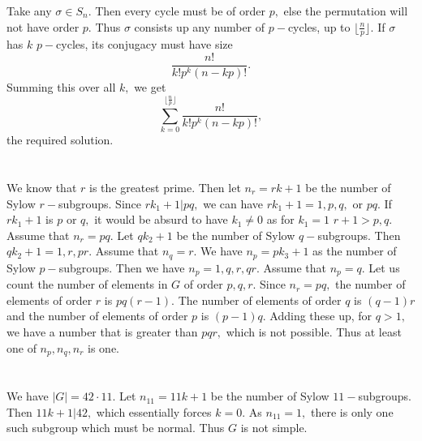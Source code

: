 \documentclass{article}
\begin{document}
Take any $\sigma \in S_n.$ Then every cycle must be of order $p,$ else the permutation will not have order $p.$ Thus $\sigma$ consists up any number of 
$p-$cycles, up to $\lfloor \frac{n}{p} \rfloor.$ If $\sigma$ has $k$ $p-$cycles, its conjugacy must have size $$\frac{n!}{k!p^k(n-kp)!}.$$
Summing this over all $k,$ we get $$\sum_{k=0}^{\lfloor \frac{n}{p} \rfloor} \frac{n!}{k!p^k(n-kp)!} ,$$ the required solution.
\section{} %
We know that $r$ is the greatest prime. Then let $n_r=rk+1$ be the number of Sylow $r-$subgroups. Since $rk_1+1|pq,$ we can have $rk_1+1=1,p,q,$ or $pq.$ If 
$rk_1+1$ is $p$ or $q,$ it would be absurd to have $k_1\neq 0$ as for $k_1=1$ $r+1 > p,q.$ Assume that $n_r=pq.$
Let $ qk_2+1$ be the number of Sylow $q-$subgroups. Then $qk_2+1=1,r,pr.$ Assume that $n_q=r.$ We have $n_p=pk_3+1$ as the number of Sylow $p-$subgroups. 
Then we have $n_p=1, q, r ,qr.$ Assume that $n_p=q.$ Let us count the number of elements in $G$ of order $p,q,r.$ Since $n_r=pq,$ the number of elements of 
order $r$ is $pq(r-1).$ The number of elements of order $q$ is $(q-1)r$ and the number of elements of order $p$ is $(p-1)q.$ Adding these up, for $q>1,$ we 
have a number that is greater than $pqr,$ which is not possible. Thus at least one of $n_p,n_q,n_r$ is one.    
\section{} %
We have $|G|=42 \cdot 11.$ Let $n_{11}=11k+1$ be the number of Sylow $11-$subgroups. Then $11k+1 | 42,$ which essentially forces $k=0.$ As $n_{11}=1,$ there 
is only one such subgroup which must be normal. Thus $G$ is not simple.
\end{document}

